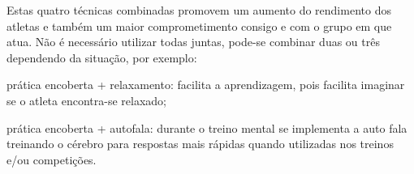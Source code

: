 \begin{Desenvolvimento}
Estas quatro técnicas combinadas promovem um aumento do rendimento dos atletas e também um maior comprometimento consigo e com o grupo em que atua. Não é necessário utilizar todas juntas, pode-se combinar duas ou três dependendo da situação, por exemplo:
\begin{alinea}
  \item prática encoberta + relaxamento: facilita a aprendizagem, pois facilita imaginar se o atleta encontra-se relaxado;
  \item prática encoberta + autofala: durante o treino mental se implementa a auto fala treinando o cérebro para respostas mais rápidas quando utilizadas nos treinos e/ou competições.
\end{alinea}


\end{Desenvolvimento}
